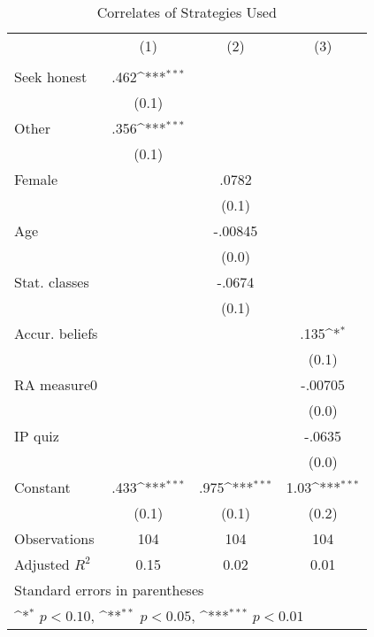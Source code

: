 \begin{table}[htbp]\centering
\def\sym#1{\ifmmode^{#1}\else\(^{#1}\)\fi}
\caption{Correlates of Strategies Used}
\begin{tabular}{l*{3}{c}}
\hline\hline
                &\multicolumn{1}{c}{(1)}&\multicolumn{1}{c}{(2)}&\multicolumn{1}{c}{(3)}\\
                &\multicolumn{1}{c}{}&\multicolumn{1}{c}{}&\multicolumn{1}{c}{}\\
\hline
Seek honest     &     .462\sym{***}&                  &                  \\
                &    (0.1)         &                  &                  \\
Other           &     .356\sym{***}&                  &                  \\
                &    (0.1)         &                  &                  \\
Female          &                  &    .0782         &                  \\
                &                  &    (0.1)         &                  \\
Age             &                  &  -.00845         &                  \\
                &                  &    (0.0)         &                  \\
Stat. classes   &                  &   -.0674         &                  \\
                &                  &    (0.1)         &                  \\
Accur. beliefs  &                  &                  &     .135\sym{*}  \\
                &                  &                  &    (0.1)         \\
RA measure0     &                  &                  &  -.00705         \\
                &                  &                  &    (0.0)         \\
IP quiz         &                  &                  &   -.0635         \\
                &                  &                  &    (0.0)         \\
Constant        &     .433\sym{***}&     .975\sym{***}&     1.03\sym{***}\\
                &    (0.1)         &    (0.1)         &    (0.2)         \\
\hline
Observations    &      104         &      104         &      104         \\
Adjusted \(R^{2}\)&     0.15         &     0.02         &     0.01         \\
\hline\hline
\multicolumn{4}{l}{\footnotesize Standard errors in parentheses}\\
\multicolumn{4}{l}{\footnotesize \sym{*} \(p<0.10\), \sym{**} \(p<0.05\), \sym{***} \(p<0.01\)}\\
\end{tabular}
\end{table}
